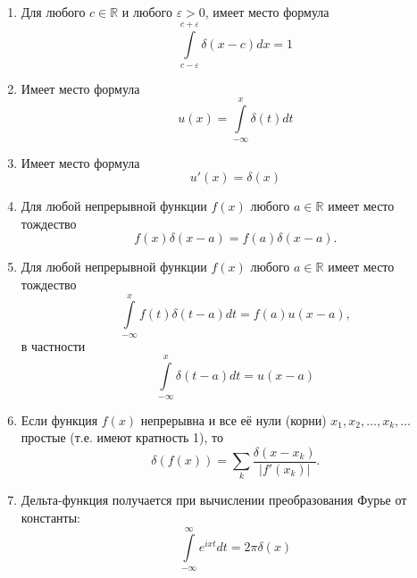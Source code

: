 \begin{prop}
\begin{enumerate}
	\item  Для любого $c \in \mathbb{R}$ и любого $\varepsilon > 0$, имеет место формула
\begin{equation*}
	\int\limits_{c-\varepsilon}^{c+\varepsilon}\delta(x-c)dx=1
\end{equation*}
	\item Имеет место формула \begin{equation*}
		u(x)=\int\limits_{-\infty}^x\delta(t)dt
	\end{equation*}
	\item Имеет место формула \begin{equation*}
		u'(x)=\delta(x)
	\end{equation*}
	\item Для любой непрерывной функции $f(x)$ любого $a \in \mathbb{R}$ имеет место тождество
	\begin{equation}
		f(x)\delta(x-a)=f(a)\delta(x-a).
	\end{equation}
	\item Для любой непрерывной функции $f(x)$ любого $a \in \mathbb{R}$ имеет место тождество
	\begin{equation}
		\int\limits_{-\infty}^xf(t)\delta(t-a)dt=f(a)u(x-a),
	\end{equation}
	в частности
	\begin{equation}
		\int\limits_{-\infty}^x\delta(t-a)dt=u(x-a)
	\end{equation}
	\item Если функция $f(x)$ непрерывна и все её нули (корни) $x_1, x_2,\dots , x_k, \dots$ простые (т.е. имеют кратность 1), то
	\begin{equation}
		\delta(f(x))=\sum\limits_k\frac{\delta(x-x_k)}{|f'(x_k)|}.
	\end{equation}
	\item Дельта-функция получается при вычислении преобразования Фурье
	от константы:
	\begin{equation}
		\int\limits_{-\infty}^{\infty}e^{ixt}dt=2\pi \delta(x)
	\end{equation}
\end{enumerate}
\end{prop}

